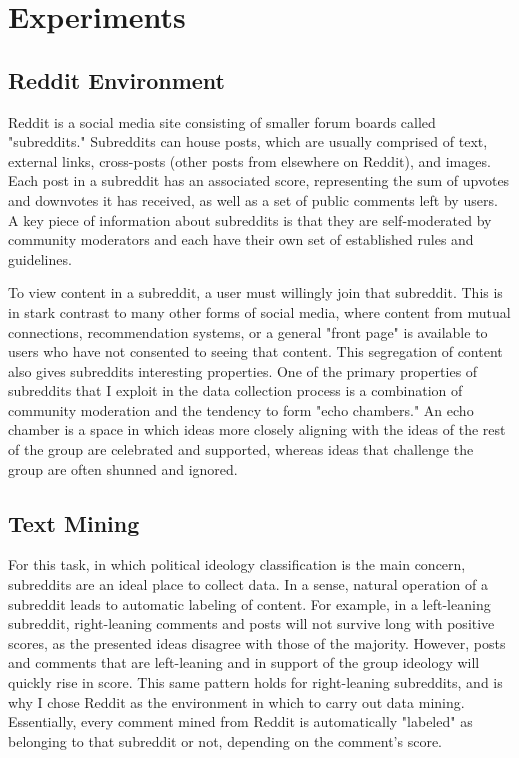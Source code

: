 \documentclass[11pt,a4paper]{article}
\begin{document}
\section{Experiments}

\subsection{Reddit Environment}

Reddit is a social media site consisting of smaller forum boards called "subreddits." Subreddits can house posts, which are usually comprised of text, external links, cross-posts (other posts from elsewhere on Reddit), and images. Each post in a subreddit has an associated score, representing the sum of upvotes and downvotes it has received, as well as a set of public comments left by users. A key piece of information about subreddits is that they are self-moderated by community moderators and each have their own set of established rules and guidelines.

To view content in a subreddit, a user must willingly join that subreddit. This is in stark contrast to many other forms of social media, where content from mutual connections, recommendation systems, or a general "front page" is available to users who have not consented to seeing that content. This segregation of content also gives subreddits interesting properties. One of the primary properties of subreddits that I exploit in the data collection process is a combination of community moderation and the tendency to form "echo chambers." An echo chamber is a space in which ideas more closely aligning with the ideas of the rest of the group are celebrated and supported, whereas ideas that challenge the group are often shunned and ignored.

\subsection{Text Mining}

For this task, in which political ideology classification is the main concern, subreddits are an ideal place to collect data. In a sense, natural operation of a subreddit leads to automatic labeling of content. For example, in a left-leaning subreddit, right-leaning comments and posts will not survive long with positive scores, as the presented ideas disagree with those of the majority. However, posts and comments that are left-leaning and in support of the group ideology will quickly rise in score. This same pattern holds for right-leaning subreddits, and is why I chose Reddit as the environment in which to carry out data mining. Essentially, every comment mined from Reddit is automatically "labeled" as belonging to that subreddit or not, depending on the comment's score.
\end{document}
